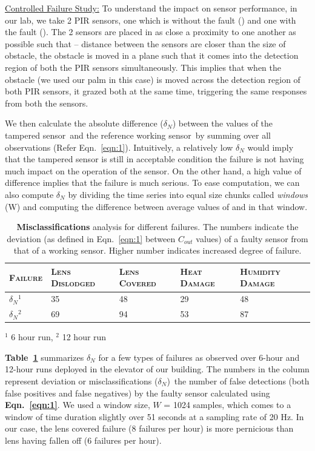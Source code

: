 \noindent \underline{Controlled Failure Study:} To understand the impact on sensor performance, in our lab, we take 2 PIR sensors, one which is without the fault (\working) and one with the fault (\tampered). The 2 sensors are placed in as close a proximity to one another as possible such that -- \ca distance between the sensors are closer than the size of obstacle, \cb the obstacle is moved in a plane such that it comes into the detection region of both the PIR sensors simultaneously. This implies that when the obstacle (we used our palm in this case) is moved across the detection region of both PIR sensors, it grazed both at the same time, triggering the same responses from both the sensors.

We then calculate the absolute difference ($\delta_N$) between the \cout values of the tampered sensor~\viz  \couttampered and the reference working sensor~\viz \coutworking by summing over all observations (Refer Eqn.~\ref{eqn:1}). Intuitively, a relatively low $\delta_N$ would imply that the tampered sensor is still in acceptable condition \ie the failure is not having much impact on the operation of the sensor. On the other hand, a high value of difference implies that the failure is much serious. To ease computation, we can also compute $\delta_N$ by dividing the time series into equal size chunks called \textit{windows} (W) and computing the difference between average \cout values of \tampered and \working in that window.

\begin{table}%
	\small
	\centering
	\caption{\textbf{Misclassifications} analysis for different failures. The numbers indicate the deviation (as defined in Eqn.~\ref{eqn:1} between $C_{out}$ values) of a faulty sensor from that of a working sensor. Higher number indicates increased degree of failure.}
	\begin{tabular}{lllll}
		\hline
		\bfseries \textsc{Failure} & \bfseries \textsc{Lens Dislodged} & \bfseries \textsc{Lens Covered} & \bfseries \textsc{Heat Damage} & \bfseries \textsc{Humidity Damage}\\
		\hline \hline
		\rowcolor{gray!20} $\delta_N$$^1$ & 35 & 48 & 29 & 48 \\
		$\delta_N$$^2$ & 69 & 94  & 53 & 87 \\
		\hline 
	\end{tabular}
	\label{tbl:fault_degree}
	\quad \raggedright
	$^1$ 6 hour run, $^2$ 12 hour run
\end{table} 

\textbf{Table~\ref{tbl:fault_degree}} summarizes $\delta_N$ for a few types of failures as observed over 6-hour and 12-hour runs deployed in the elevator of our building. The numbers in the column represent deviation or misclassifications ($\delta_N$)~\ie the number of false detections (both false positives and false negatives) by the faulty sensor calculated using {\bfseries Eqn.~\ref{eqn:1}}.
We used a window size, $W$ = 1024 samples, which comes to a window of time duration slightly over 51 seconds at a sampling rate of 20 Hz.
In our case, the lens covered failure (8 failures per hour) is more pernicious than lens having fallen off (6 failures per hour).

